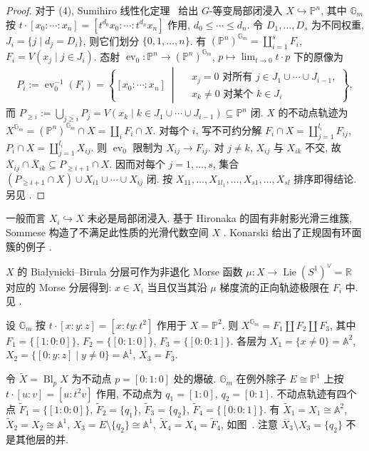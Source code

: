 \begin{proof}
对于 (4), Sumihiro 线性化定理~ 给出 $G$-等变局部闭浸入 $X\hookrightarrow\mathbb P^n$, 其中 $\mathbb G_m$ 按 $t\cdot[x_0:\cdots:x_n]=[t^{d_0}x_0:\cdots:t^{d_n}x_n]$ 作用, $d_0\le\cdots\le d_n$. 令 $D_1,\ldots,D_s$ 为不同权重, $J_i=\{j\mid d_j=D_i\}$, 则它们划分 $\{0,1,\ldots,n\}$. 有 $(\mathbb P^n)^{\mathbb G_m}=\coprod_{i=1}^sF_i$, $F_i=V(x_j\mid j\in J_i)$. 态射 $\operatorname{ev}_0:\mathbb P^n\to(\mathbb P^n)^{\mathbb G_m}$, $p\mapsto\lim_{t\to0}t\cdot p$ 下的原像为
\begin{align*}
P_i:=\operatorname{ev}_0^{-1}(F_i)=\left\{[x_0:\cdots:x_n]\;\middle|\;\begin{aligned}
&x_j=0\text{ 对所有 }j\in J_1\cup\cdots\cup J_{i-1},\\
&x_k\ne0\text{ 对某个 }k\in J_i
\end{aligned}\right\},
\end{align*}
而 $P_{\ge i}:=\bigcup_{j\ge i}P_j=V(x_k\mid k\in J_1\cup\cdots\cup J_{i-1})\subseteq\mathbb P^n$ 闭. $X$ 的不动点轨迹为 $X^{\mathbb G_m}=(\mathbb P^n)^{\mathbb G_m}\cap X=\coprod_iF_i\cap X$. 对每个 $i$, 写不可约分解 $F_i\cap X=\coprod_{j=1}^{l_i}F_{ij}$, $P_i\cap X=\coprod_{j=1}^{l_i}X_{ij}$. 则 $\operatorname{ev}_0$ 限制为 $X_{ij}\to F_{ij}$. 对 $j\ne k$, $X_{ij}$ 与 $X_{ik}$ 不交, 故 $\overline X_{ij}\cap\overline X_{ik}\subseteq P_{\ge i+1}\cap X$. 因而对每个 $j=1,\ldots,s$, 集合 $(P_{\ge i+1}\cap X)\cup X_{i1}\cup\cdots\cup X_{ij}$ 闭. 按 $X_{11},\ldots,X_{1l_1},\ldots,X_{s1},\ldots,X_{sl}$ 排序即得结论. 另见 \cite[定理 3]{BB76}.
\end{proof}
\begin{remark}\label{src:7.8.16}
一般而言 $X_i\hookrightarrow X$ 未必是局部闭浸入. 基于 Hironaka 的固有非射影光滑三维簇, Sommese 构造了不满足此性质的光滑代数空间 $X$ \cite{Som82}. Konarski 给出了正规固有环面簇的例子 \cite{Kon82}.
\end{remark}
\begin{remark}[Morse 分层]\label{src:7.8.17}
$X$ 的 Białynicki--Birula 分层可作为非退化 Morse 函数 $\mu:X\to\operatorname{Lie}(S^1)^\vee=\mathbb R$ 对应的 Morse 分层得到: $x\in X_i$ 当且仅当其沿 $\mu$ 梯度流的正向轨迹极限在 $F_i$ 中. 见 \cite{CS79}.
\end{remark}
\begin{example}\label{src:7.8.18}
设 $\mathbb G_m$ 按 $t\cdot[x:y:z]=[x:ty:t^2]$ 作用于 $X=\mathbb P^2$. 则 $X^{\mathbb G_m}=F_1\amalg F_2\amalg F_3$, 其中 $F_1=\{[1:0:0]\}$, $F_2=\{[0:1:0]\}$, $F_3=\{[0:0:1]\}$. 各层为 $X_1=\{x\ne0\}=\mathbb A^2$, $X_2=\{[0:y:z]\mid y\ne0\}=\mathbb A^1$, $X_3=F_3$.

令 $\widetilde X=\operatorname{Bl}_pX$ 为不动点 $p=[0:1:0]$ 处的爆破. $\mathbb G_m$ 在例外除子 $E\cong\mathbb P^1$ 上按 $t\cdot[u:v]=[u:t^2v]$ 作用, 不动点为 $q_1=[1:0]$, $q_2=[0:1]$. 不动点轨迹有四个点 $\widetilde F_1=\{[1:0:0]\}$, $\widetilde F_2=\{q_1\}$, $\widetilde F_3=\{q_2\}$, $\widetilde F_4=\{[0:0:1]\}$. 有 $\widetilde X_1=X_1\cong\mathbb A^2$, $\widetilde X_2=X_2\cong\mathbb A^1$, $X_3=E\setminus\{q_2\}\cong\mathbb A^1$, $\widetilde X_4=X_4=\widetilde F_4$, 如图~. 注意 $\overline X_3\setminus X_3=\{q_2\}$ 不是其他层的并.
\end{example}
